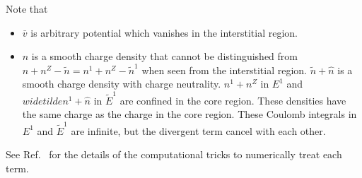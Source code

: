 \documentclass{article}
\begin{document}
Note that 
\begin{itemize}
  \item $\bar{v}$ is arbitrary potential which vanishes in the interstitial region.
  \item $\hat{n}$ is a smooth charge density that cannot be distinguished from $n + n^Z - \widetilde{n} = n^1 + n^Z - \widetilde{n}^1$ when seen from the interstitial region. $\widetilde{n} + \hat{n}$ is a smooth charge density with charge neutrality. ${n}^1 + n^Z$ in $E^1$ and $widetilde{n}^1 + \hat{n}$ in $\widetilde{E}^1$ are confined in the core region. These densities have the same charge as the charge in the core region. These Coulomb integrals in $E^1$ and $\widetilde{E}^1$ are infinite, but the divergent term cancel with each other.
\end{itemize}
See Ref.~\cite{PhysRevB.50.17953} for the details of the computational tricks to numerically treat each term.









\end{document}
